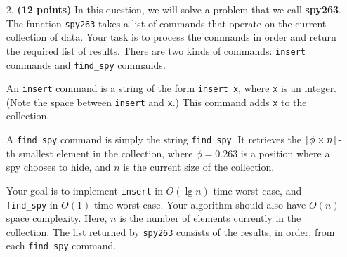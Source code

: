 \documentclass{assignment-263}
\begin{document}
\begin{enumerate}
\item[2.] \textbf{(12 points)}
    In this question, we will solve a problem that we call {\bf spy263}.
    The function \verb|spy263| takes a list of commands that
    operate on the current collection of data.
    Your task is to process the commands in order and return the required list of results.
    There are two kinds of commands: \verb|insert| commands and \verb|find_spy| commands.

    An \verb|insert| command is a string of the form \verb|insert x|,
    where \verb|x| is an integer. (Note the space between \verb|insert| and \verb|x|.)
    This command adds \verb|x| to the collection.

    A \verb|find_spy| command is simply the string \verb|find_spy|.
    It retrieves the $\left \lceil \phi\times n \right \rceil$-th smallest element in the collection, where 
    $\phi=0.263$ is a position where a spy chooses to hide,
    and $n$ is the current size of the collection.

    Your goal is to implement \verb|insert| in $O(\lg n)$ time worst-case, and 
    \verb|find_spy| in $O(1)$ time worst-case.
    Your algorithm should also have $O(n)$ space complexity.
    Here, $n$ is the number of elements currently in the collection.
    The list returned by \verb|spy263| consists of the results, in order,
    from each \verb|find_spy| command.


\end{enumerate}
\end{document}
